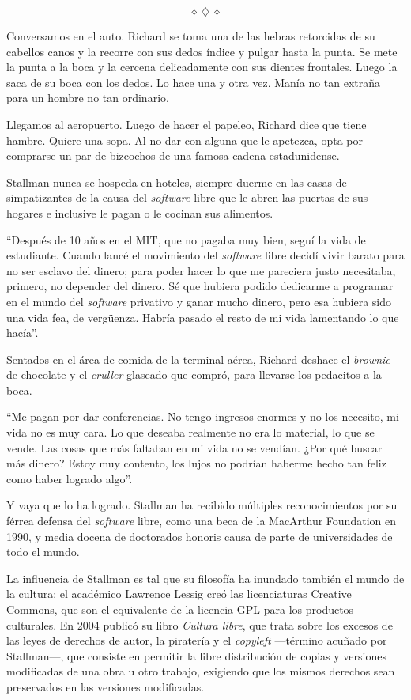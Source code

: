 \documentclass[oneside,twocolumn]{article}
\begin{document}
\[\diamond~\diamondsuit~\diamond\]

Conversamos en el auto. Richard se toma una de las hebras retorcidas de su cabellos canos y la recorre 
con sus dedos índice y pulgar hasta la punta. Se mete la punta a la boca y la cercena delicadamente con 
sus dientes frontales. Luego la saca de su boca con los dedos. Lo hace una y otra vez. Manía no tan extraña 
para un hombre no tan ordinario.

Llegamos al aeropuerto. Luego de hacer el papeleo, Richard dice que tiene hambre. Quiere una sopa. 
Al no dar con alguna que le apetezca, opta por comprarse un par de bizcochos de una famosa cadena 
estadunidense. 

Stallman nunca se hospeda en hoteles, siempre duerme en las casas de simpatizantes de la causa del 
\emph{software} libre que le abren las puertas de sus hogares e inclusive le pagan o le cocinan sus
alimentos.

``Después de 10 años en el MIT, que no pagaba muy bien, seguí la vida de estudiante. Cuando lancé el 
movimiento del \emph{software} libre decidí vivir barato para no ser esclavo del dinero; para poder
hacer lo que me pareciera justo necesitaba, primero, no depender del dinero. Sé que hubiera podido 
dedicarme a programar en el mundo del \emph{software} privativo y ganar mucho dinero, pero esa 
hubiera sido una vida fea, de vergüenza. Habría pasado el resto de mi vida lamentando lo que hacía''.

Sentados en el área de comida de la terminal aérea, Richard deshace el \emph{brownie} de chocolate y
el \emph{cruller} glaseado que compró, para llevarse los pedacitos a la boca.

``Me pagan por dar conferencias. No tengo ingresos enormes y no los necesito, mi vida no es muy cara. 
Lo que deseaba realmente no era lo material, lo que se vende. Las cosas que más faltaban en mi vida no 
se vendían. ¿Por qué buscar más dinero? Estoy muy contento, los lujos no podrían haberme hecho tan feliz
como haber logrado algo''.

Y vaya que lo ha logrado. Stallman ha recibido múltiples reconocimientos por su férrea defensa del
\emph{software} libre, como una beca de la MacArthur Foundation en 1990, y media docena de doctorados 
honoris causa de parte de universidades de todo el mundo.

La influencia de Stallman es tal que su filosofía ha inundado también el mundo de la cultura; el académico 
Lawrence Lessig creó las licenciaturas Creative Commons, que son el equivalente de la licencia GPL para los 
productos culturales. En 2004 publicó su libro \emph{Cultura libre}, que trata sobre los excesos de las 
leyes de derechos de autor, la piratería y el \emph{copyleft} ---término acuñado por Stallman---, que consiste 
en permitir la libre distribución de copias y versiones modificadas de una obra u otro trabajo, exigiendo que 
los mismos derechos sean preservados en las versiones modificadas.
\end{document}
